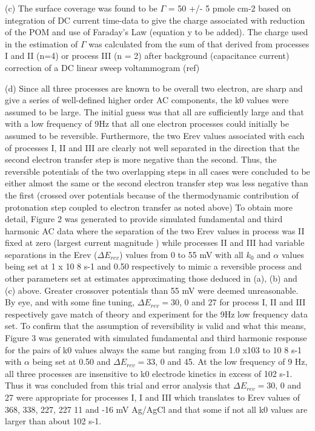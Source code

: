 \documentclass[a4paper, 12pt]{article}
\begin{document}
(c) The surface coverage was found to be $\Gamma$ = 50 +/- 5 pmole cm-2 based on 
integration of DC current time-data to give the charge associated with reduction 
of the POM and use of Faraday’s Law (equation y to be added). The charge used in 
the estimation of $\Gamma$ was calculated from the sum of that derived from 
processes I and II (n=4) or process   III (n = 2) after   background 
(capacitance current) correction of a DC linear sweep voltammogram (ref)

(d) Since all three processes are known to be overall two electron, are sharp 
and give a series of well-defined higher order AC components, the k0 values were 
assumed to be large. The initial guess was that all are sufficiently large and 
that with a low frequency of 9Hz that all one electron processes could initially 
be assumed to be reversible.  Furthermore, the two Erev values associated with 
each of processes I, II and III are clearly not well separated in the direction 
that the second electron transfer step is more negative than the second.  Thus, 
the reversible potentials of the two  overlapping  steps in all cases were 
concluded to be either almost the same  or the second electron transfer step was 
less negative  than the first (crossed over potentials because of the 
thermodynamic contribution of protonation step coupled to electron transfer as 
noted above) To obtain more detail, Figure 2 was generated to provide simulated 
fundamental and third harmonic AC  data where the separation of the two Erev 
values in process was II fixed at zero (largest current magnitude ) while  
processes  II and III had variable separations in the Erev ($\Delta E_{rev}$) 
values from 0 to 55 mV with all $k_0$ and $\alpha$  values being set at 1 x 10 8  
s-1  and 0.50 respectively to mimic a reversible process  and other parameters 
set at estimates approximating those deduced in (a), (b) and (c) above.  Greater 
crossover potentials   than 55 mV were deemed unreasonable. By eye, and with 
some fine tuning, $\Delta E_{rev} = 30$, 0 and 27  for process I, II and III 
respectively gave match of theory and experiment for the 9Hz low frequency data 
set. To confirm that the assumption of reversibility is valid and what this 
means, Figure 3  was generated with  simulated fundamental and third harmonic 
response for the pairs of k0 values always the same but ranging from 1.0 x103 to 
10 8  s-1  with $\alpha$ being set at 0.50 and $\Delta E_{rev} = 33$, 0 and 45.  
At the low frequency of 9 Hz, all three processes are insensitive to k0 
electrode kinetics in excess of 102 s-1. Thus it was concluded from this trial 
and error analysis that $\Delta E_{rev} = 30$, 0 and 27 were appropriate for 
processes I, I and III which translates to Erev values of 368, 338, 227, 227 11 
and -16 mV Ag/AgCl and that some if not all k0 values are larger than about 102 
s-1.   
\end{document}
